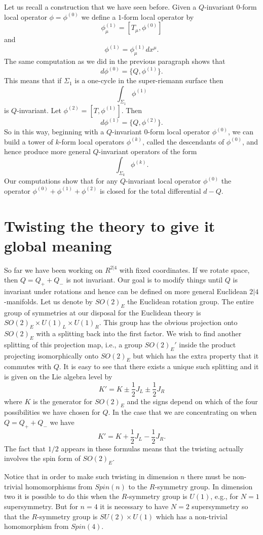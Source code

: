 Let us recall a construction that we have seen before. Given a $Q$-invariant $0$-form local operator
$\phi=\phi^{(0)}$ we define 
a $1$-form local operator by 
$$\phi_\mu^{(1)}=[T_\mu,\phi^{(0)}]$$
and
$$\phi^{(1)}=\phi_\mu^{(1)}dx^\mu.$$
The same computation as we did in the previous paragraph shows that
$$d\phi^{(0)}=\{Q,\phi^{(1)}\}.$$
This means that if $\Sigma_1$ is a one-cycle in the super-riemann
surface then
$$\int_{\Sigma_1}\phi^{(1)}$$
is $Q$-invariant.
Let $\phi^{(2)}=[T,\phi^{(1)}]$. Then
$$d\phi^{(1)}=\{Q,\phi^{(2)}\}.$$
So in this way, beginning with a $Q$-invariant $0$-form  local operator
$\phi^{(0)}$, 
we can build a tower of $k$-form local operators
$\phi^{(k)}$, called the descendants of $\phi^{(0)}$, and
hence produce more general $Q$-invariant operators of the form
$$\int_{\Sigma_k}\phi^{(k)}.$$
Our computations show that
for any $Q$-invariant local operator $\phi^{(0)}$ the operator
$\phi^{(0)}+\phi^{(1)}+\phi^{(2)}$ is closed for the total differential   
$d-Q$. 


\section{Twisting the theory to give it global meaning}

So far we have been working on $R^{2|4}$ with fixed coordinates. If we
rotate space, then $Q=Q_++Q_-$ is not invariant. Our goal is to modify
things until $Q$ is invariant under rotations and hence can be defined
on more general Euclidean $2|4$-manifolds. Let us denote by $SO(2)_E$ the  
Euclidean rotation group. The entire group of symmetries at our
disposal for the Euclidean theory is $SO(2)_E\times U(1)_L\times
U(1)_R$.
This group has the obvious projection onto $SO(2)_E$ with a splitting
back into the first factor. We wish to find another splitting of this
projection map, i.e., a group $SO(2)_E'$ inside the product projecting
isomorphically onto $SO(2)_E$ but which has the extra property that it
commutes with $Q$. It is easy to see that there exists a unique such
splitting and it is given on the Lie algebra level by
$$K'=K\pm\frac{1}{2}J_L\pm \frac{1}{2}J_R$$
where $K$ is the generator for $SO(2)_E$ and the signs depend on which
of the four possibilities we have chosen for $Q$. In the case that we
are concentrating on when $Q=Q_++Q_-$ we have
$$K'=K+\frac{1}{2}J_L-\frac{1}{2} J_R.$$
The fact that $1/2$ appears in these formulas means that the twisting
actually involves the spin form of $SO(2)_E$.

Notice that in order to make such twisting in dimension $n$ there must
be non-trivial homomorphisms from $Spin(n)$ to the $R$-symmetry group.
In dimension two it is possible to do this when the $R$-symmetry group
is $U(1)$, e.g., for $N=1$ supersymmetry. But for $n=4$ it is
necessary to have $N=2$ supersymmetry so that the $R$-symmetry group
is $SU(2)\times U(1)$  which has a non-trivial homomorphism from $Spin(4)$.

